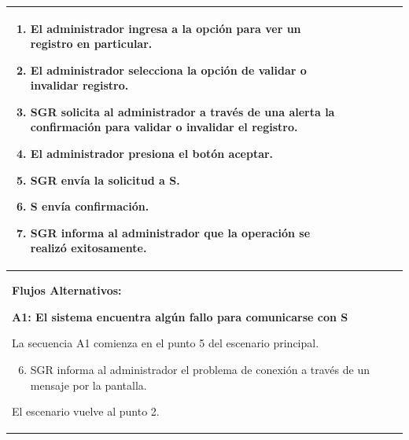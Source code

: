 \begin{longtable}{|l|p{5.5cm}|l|p{2cm}|l|p{1.9cm}|}
{					\begin{enumerate}
							\item El administrador ingresa a la opción para ver un registro en particular.
							\item El administrador selecciona la opción de validar o invalidar registro.
							\item SGR solicita al administrador a través de una alerta la confirmación para validar o invalidar el registro.
							\item El administrador presiona el botón aceptar.
							\item SGR envía la solicitud a S.
							\item S envía confirmación.
							\item SGR informa al administrador que la operación se realizó exitosamente.
					\end{enumerate}

					} \\ \hline

					\multicolumn{6}{|p{15cm}|}{ \textbf{Flujos Alternativos: }
					
					\textbf{A1: El sistema encuentra algún fallo para comunicarse con S}
					
					La secuencia A1 comienza en el punto 5 del escenario principal.
					\begin{enumerate}
							\setcounter{enumi}{5}
							\item SGR informa al administrador el problema de conexión a través de un mensaje por la pantalla.
					\end{enumerate}

					El escenario vuelve al punto 2.

					} \\ \hline

			\end{longtable}

